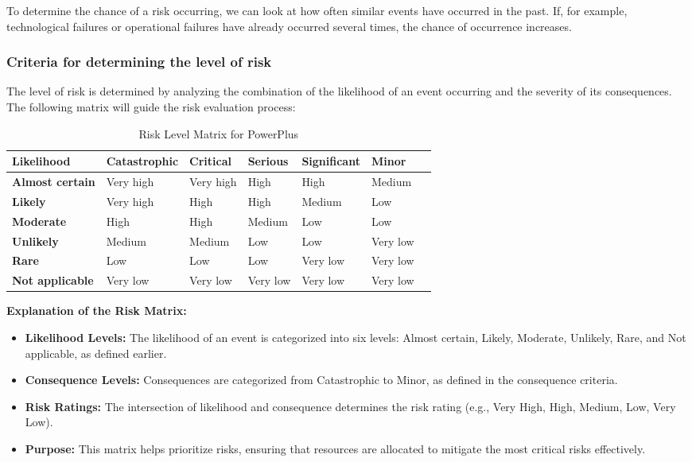 To determine the chance of a risk occurring, we can look at how often similar events have occurred in the past. If, for example, technological failures or operational failures have already occurred several times, the chance of occurrence increases.

\subsubsection{Criteria for determining the level of risk}

The level of risk is determined by analyzing the combination of the likelihood of an event occurring and the severity of its consequences. The following matrix will guide the risk evaluation process:

\begin{table}[h!]
\centering
\begin{tabular}{|l|l|l|l|l|l|l|}
\hline
\textbf{Likelihood}   & \textbf{Catastrophic} & \textbf{Critical} & \textbf{Serious} & \textbf{Significant} & \textbf{Minor} \\ \hline
\textbf{Almost certain} & Very high           & Very high          & High             & High                 & Medium         \\ \hline
\textbf{Likely}         & Very high           & High               & High             & Medium               & Low            \\ \hline
\textbf{Moderate}       & High                & High               & Medium           & Low                  & Low            \\ \hline
\textbf{Unlikely}       & Medium              & Medium             & Low              & Low                  & Very low       \\ \hline
\textbf{Rare}           & Low                 & Low                & Low              & Very low             & Very low       \\ \hline
\textbf{Not applicable} & Very low            & Very low           & Very low         & Very low             & Very low       \\ \hline
\end{tabular}
\caption{Risk Level Matrix for PowerPlus}
\end{table}

\textbf{Explanation of the Risk Matrix:}
\begin{itemize}
    \item \textbf{Likelihood Levels:} The likelihood of an event is categorized into six levels: Almost certain, Likely, Moderate, Unlikely, Rare, and Not applicable, as defined earlier.
    \item \textbf{Consequence Levels:} Consequences are categorized from Catastrophic to Minor, as defined in the consequence criteria.
    \item \textbf{Risk Ratings:} The intersection of likelihood and consequence determines the risk rating (e.g., Very High, High, Medium, Low, Very Low).
    \item \textbf{Purpose:} This matrix helps prioritize risks, ensuring that resources are allocated to mitigate the most critical risks effectively.
\end{itemize}

